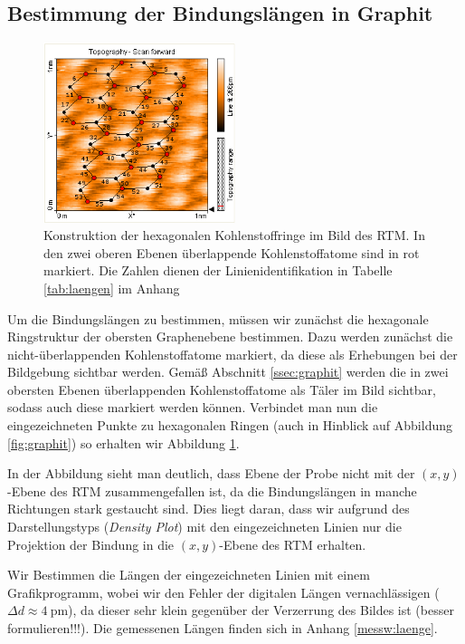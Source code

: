 \documentclass[10pt, a4paper]{article}
\begin{document}
\subsection{Bestimmung der Bindungslängen in Graphit}
\label{ssec:laenge}
\begin{figure}[h]
\centering
\includegraphics[width=0.5\textwidth]{./grafiken/laenge.png}
\caption{Konstruktion der hexagonalen Kohlenstoffringe im Bild des RTM. In den zwei oberen Ebenen überlappende Kohlenstoffatome sind in rot markiert. Die Zahlen dienen der Linienidentifikation in Tabelle \ref{tab:laengen} im Anhang}
\label{fig:laengen}
\end{figure}
Um die Bindungslängen zu bestimmen, müssen wir zunächst die hexagonale Ringstruktur der obersten Graphenebene bestimmen.
Dazu werden zunächst die nicht-überlappenden Kohlenstoffatome markiert, da diese als Erhebungen bei der Bildgebung sichtbar werden.
Gemäß Abschnitt \ref{ssec:graphit} werden die in zwei obersten Ebenen überlappenden Kohlenstoffatome als Täler im Bild sichtbar, sodass auch diese markiert werden können.
Verbindet man nun die eingezeichneten Punkte zu hexagonalen Ringen (auch in Hinblick auf Abbildung \ref{fig:graphit}) so erhalten wir Abbildung \ref{fig:laengen}.

In der Abbildung sieht man deutlich, dass Ebene der Probe nicht mit der $(x,y)$-Ebene des RTM zusammengefallen ist, da die Bindungslängen in manche Richtungen stark gestaucht sind.
Dies liegt daran, dass wir aufgrund des Darstellungstyps (\emph{Density Plot}) mit den eingezeichneten Linien nur die Projektion der Bindung in die $(x,y)$-Ebene des RTM erhalten.

Wir Bestimmen die Längen der eingezeichneten Linien mit einem Grafikprogramm, wobei wir den Fehler der digitalen Längen vernachlässigen ($\Delta d \approx \SI{4}{\pico\metre}$), da dieser sehr klein gegenüber der Verzerrung des Bildes ist (besser formulieren!!!).
Die gemessenen Längen finden sich in Anhang \ref{messw:laenge}.
\end{document}
